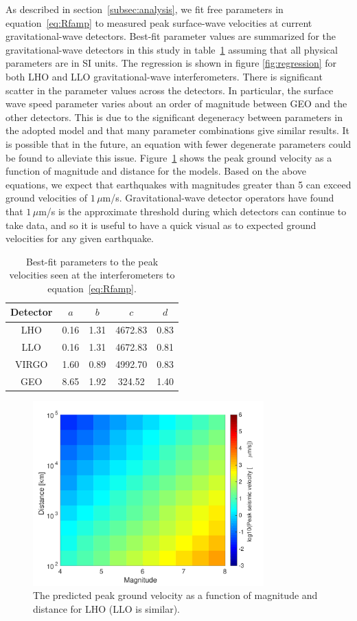 \documentclass[twocolumn, aps, superscriptaddress]{revtex4}
\begin{document}
As described in section~\ref{subsec:analysis}, we fit free parameters in equation~\ref{eq:Rfamp} to measured peak surface-wave velocities at current gravitational-wave detectors. Best-fit parameter values are summarized for the gravitational-wave detectors in this study in table~\ref{table:fit} assuming that all physical parameters are in SI units. The regression is shown in figure \ref{fig:regression} for both LHO and LLO gravitational-wave interferometers.
There is significant scatter in the parameter values across the detectors. In particular, the surface wave speed parameter varies about an order of magnitude between GEO and the other detectors. This is due to the significant degeneracy between parameters in the adopted model and that many parameter combinations give similar results. It is possible that in the future, an equation with fewer degenerate parameters could be found to alleviate this issue.
Figure~\ref{fig:MvsR} shows the peak ground velocity as a function of magnitude and distance for the models. Based on the above equations, we expect that earthquakes with magnitudes greater than 5 can exceed ground velocities of $1\,\mu$m/s. Gravitational-wave detector operators have found that $1\,\mu$m/s is the approximate threshold during which detectors can continue to take data, and so it is useful to have a quick visual as to expected ground velocities for any given earthquake.
\begin{table}[]
\centering
\begin{tabular}{|c|c|c|c|c|}
\hline
Detector & $a$ & $b$ & $c$ & $d$ \\ \hline
LHO & 0.16 & 1.31 & 4672.83 & 0.83 \\ \hline
LLO & 0.16 & 1.31 & 4672.83 & 0.81 \\ \hline
VIRGO & 1.60 & 0.89 & 4992.70 & 0.83 \\ \hline
GEO & 8.65 & 1.92 & 324.52 & 1.40 \\ \hline
\end{tabular}
\caption{Best-fit parameters to the peak velocities seen at the interferometers to equation~\ref{eq:Rfamp}.}
\label{table:fit}
\end{table}

\begin{figure}[t]
\hspace*{-0.5cm}
 \includegraphics[width=3.5in]{LHO_M_r.pdf}
 \caption{The predicted peak ground velocity as a function of magnitude and distance for LHO (LLO is similar).}
 \label{fig:MvsR}
\end{figure}
\end{document}
